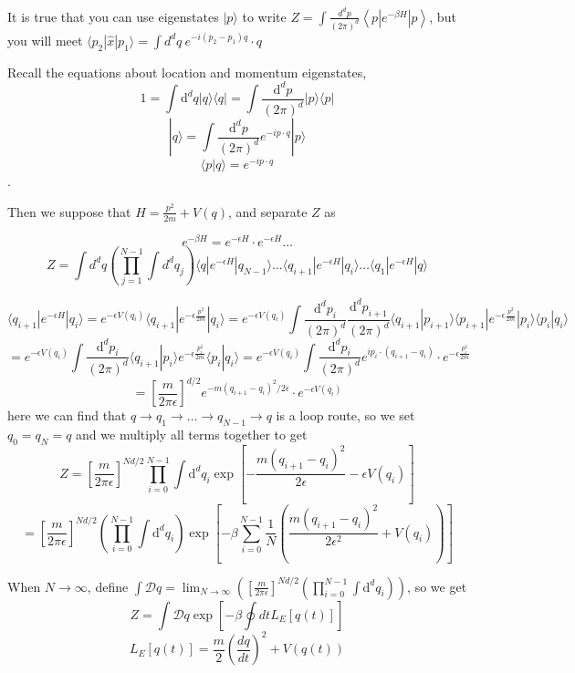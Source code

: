 \documentclass[prd,aps,nofootinbib,floatfix,10pt]{revtex4}
\begin{document}
It is true that you can use eigenstates $| p \rangle$ to write $Z = \int \frac{d^d p}{(2\pi)^d} \left\langle p | e^{-\beta H} | p \right\rangle$, but you will meet $\langle p_2 | \hat{x} | p_1 \rangle = \int d^d q \ e^{-i (p_2 - p_1)q} \cdot q$

Recall the equations about location and momentum eigenstates,
\[ 1=\int \mathrm{d}^{d} q|q\rangle\langle q|=\int \frac{\mathrm{d}^{d} p}{(2 \pi)^{d}}|p\rangle\langle p| \]
\[ |q\rangle = \int \frac{\mathrm{d}^{d} p}{(2 \pi)^{d}} e^{-i p \cdot q} |p\rangle \]
\[ \langle p|q\rangle = e^{-i p \cdot q} \].

Then we suppose that $H = \frac{p^2}{2m} + V(q)$, and separate $Z$ as

\[ e^{- \beta H} = e^{-\epsilon H} \cdot e^{-\epsilon H} \dots \]
\[ Z = \int d^d q (\prod_{j=1}^{N-1} \int d^d q_j )  \langle q | e^{-\epsilon H} | q_{N-1} \rangle \dots \langle q_{i+1} | e^{-\epsilon H} | q_{i} \rangle \dots \langle q_{1} | e^{-\epsilon H} | q \rangle \]

\[ \langle q_{i+1} | e^{-\epsilon H} | q_{i} \rangle = e^{-\epsilon V(q_i)} \langle q_{i+1} | e^{-\epsilon \frac{p^2}{2m}} | q_{i} \rangle = e^{-\epsilon V(q_i)} \int \frac{\mathrm{d}^{d} p_i}{(2 \pi)^{d}} \frac{\mathrm{d}^{d} p_{i+1}}{(2 \pi)^{d}}  \langle q_{i+1} | p_{i+1} \rangle \langle p_{i+1} | e^{-\epsilon \frac{p^2}{2m}} | p_i \rangle \langle p_i | q_{i} \rangle  \]
\[ = e^{-\epsilon V(q_i)} \int \frac{\mathrm{d}^{d} p_i}{(2 \pi)^{d}} \langle q_{i+1} | p_{i} \rangle e^{-\epsilon \frac{p_i^2}{2m}} \langle p_i | q_{i} \rangle = e^{-\epsilon V(q_i)} \int \frac{\mathrm{d}^{d} p_i}{(2 \pi)^{d}} e^{i p_i \cdot (q_{i+1} - q_i)} \cdot e^{-\epsilon \frac{p_i^2}{2m}} \]
\[ = \left[\frac{m}{2 \pi \epsilon}\right]^{d / 2} e^{-m\left(q_{i+1}-q_{i}\right)^{2} / 2 \epsilon} \cdot e^{-\epsilon V(q_i)} \]
here we can find that $q \to q_1 \to \dots \to q_{N-1} \to q$ is a loop route, so we set $q_0 = q_N = q$ and we multiply all terms together to get
\[ Z=\left[\frac{m}{2 \pi \epsilon}\right]^{N d / 2} \prod_{i=0}^{N-1} \int \mathrm{d}^{d} q_{i} \exp \left[-\frac{m\left(q_{i+1}-q_{i}\right)^{2}}{2 \epsilon}-\epsilon V\left(q_{i}\right)\right] \]
\[=\left[\frac{m}{2 \pi \epsilon}\right]^{N d / 2} (\prod_{i=0}^{N-1} \int \mathrm{d}^{d} q_{i}) \exp \left[-\beta \sum_{i=0}^{N-1} \frac{1}{N} ( \frac{m\left(q_{i+1}-q_{i}\right)^{2}}{2 \epsilon^2} + V\left(q_{i}\right))\right]\]

When $N \to \infty$, define $\int \mathcal{D} q = \lim_{N\to \infty} ( \left[\frac{m}{2 \pi \epsilon}\right]^{N d / 2} (\prod_{i=0}^{N-1} \int \mathrm{d}^{d} q_{i}) ) $, so we get
\[ Z = \int \mathcal{D} q \exp[-\beta \oint dt L_E[q(t)]] \]
\[ L_E[q(t)] = \frac{m}{2} (\frac{dq}{dt})^2 + V(q(t)) \]



\begin{thebibliography}{1}
	
\end{thebibliography}
\end{document}
